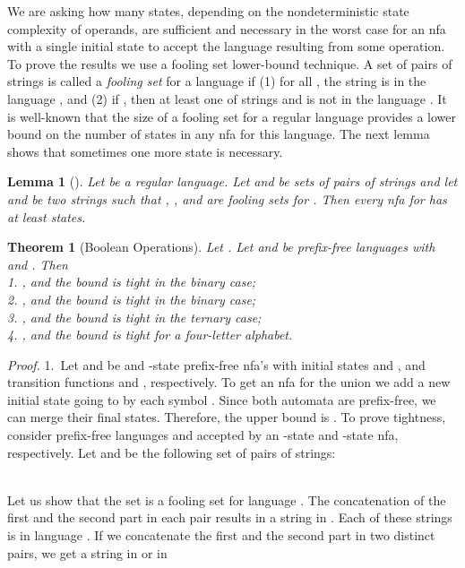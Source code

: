 \documentclass[copyright]{eptcs}
\newtheorem{theorem}{Theorem}
\newtheorem{lemma}{Lemma}
\begin{document}
 We are asking how many states, depending 
 on the nondeterministic state complexity of operands, 
 are sufficient and necessary in the worst case for an nfa 
 with a single initial state
 to accept the language resulting from some operation.
 To prove the results we use
 a fooling set lower-bound technique. 
 A set of pairs of strings 
 is called a \emph{fooling set} for a language  if
 (1) for all , the string  is in the language , and
 (2) if , then at least one of  strings
  and  is not in the language .
 It is well-known that the size of a fooling set for a regular language
 provides a lower bound on the number of states
 in any nfa for this language. 
 The next lemma shows that sometimes one more state is necessary.

 \begin{lemma}[\cite{jm10}]\label{le:fool}
  Let  be a regular language.
  Let  and  be sets of pairs of strings
  and let  and  be two strings such that
  ,
  , and
   are fooling sets for .
  Then every nfa for  has at least  states.
 \hfill
 \end{lemma}

 \begin{theorem}[Boolean Operations]\label{thm:boolean}
  Let . Let   and 
  be  prefix-free languages  with  and .
  Then \\
  1. , and the bound is tight in the binary case;\\
  2. , and the bound is tight in the binary case;\\
  3. ,
     and the bound is tight in the ternary case;\\
  4. ,
    and the bound is tight for a four-letter alphabet.
 \end{theorem}

 \noindent\emph{Proof.}
  1.~Let  and  be  and -state prefix-free nfa's
  with initial states  and ,
  and transition functions  and , respectively.
  To get an nfa for the union we add a new initial state
  going to  by each symbol .
  Since both automata are prefix-free,
  we can merge their final states.
  Therefore, the upper bound is .
  To prove tightness, consider  prefix-free languages
   and 
  accepted by an -state and -state nfa, respectively.
  Let  and  be the following set of pairs of strings:
  
  
                       
   \\
   Let us show that the set 
   is a fooling set for  language .
   The concatenation of the first and the second part in each pair results
   in a string in .
   Each of these strings is in language .
   If we concatenate
   the first and the second part in two distinct pairs,
   we get a string in 
    or in
   
\end{document}
